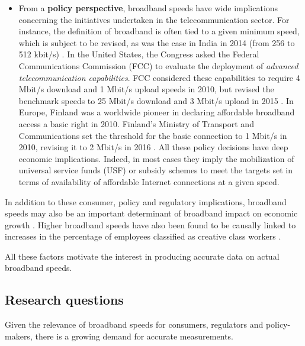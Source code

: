 \documentclass[12pt]{article}
\begin{document}
\begin{itemize}
	\item From a \textbf{policy perspective}, broadband speeds have wide implications concerning the initiatives undertaken in the telecommunication sector. For instance, the definition of broadband is often tied to a given minimum speed, which is subject to be revised, as was the case in India in 2014 (from 256 to 512 kbit/s) \citep{trai2014}. In the United States, the Congress asked the Federal Communications Commission (FCC) to evaluate the deployment of \textit{advanced telecommunication capabilities}. FCC considered these capabilities to require 4 Mbit/s download and 1 Mbit/s upload speeds in 2010, but revised the benchmark speeds to 25 Mbit/s download and 3 Mbit/s upload in 2015 \citep{fcc2015a}. In Europe, Finland was a worldwide pioneer in declaring affordable broadband access a basic right in 2010. Finland's Ministry of Transport and Communications set the threshold for the basic connection to 1 Mbit/s in 2010, revising it to 2 Mbit/s in 2016 \citep{eprs}. All these policy decisions have deep economic implications. Indeed, in most cases they imply the mobilization of universal service funds (USF) or subsidy schemes to meet the targets set in terms of availability of affordable Internet connections at a given speed.        
\end{itemize}

In addition to these consumer, policy and regulatory implications, broadband speeds may also be an important determinant of broadband impact on economic growth \citep{bohlin2012}. Higher broadband speeds have also been found to be causally linked to increases in the percentage of employees classified as creative class workers \citep{whitacre2014}. 

All these factors motivate the interest in producing accurate data on actual broadband speeds.     

\subsection{Research questions}
\vspace{1cm}
\setlength{\fboxsep}{1em}
\centerline{}
\vspace{1cm}
Given the relevance of broadband speeds for consumers, regulators and policy-makers, there is a growing demand for accurate measurements. 
\end{document}
